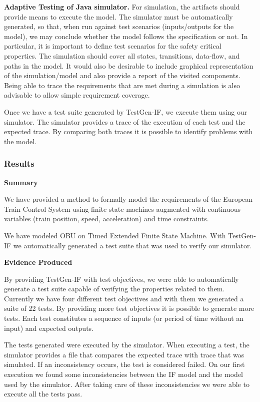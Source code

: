 \documentclass{template/openetcs_article}
\begin{document}
\textbf{Adaptive Testing of Java simulator.}
For simulation, the artifacts should provide means to execute the model.  The
simulator must be automatically generated, so that, when run against test
scenarios (inputs/outputs for the model), we may conclude whether the model
follows the specification or not. In particular, it is important to define test
scenarios for the safety critical properties. The simulation should cover all states,
transitions, data-flow, and paths in the model. It would also be desirable to
include graphical representation of the simulation/model and also provide a
report of the visited components. Being able to trace the
requirements that are met during a simulation is also advisable to allow simple
requirement coverage.

Once we have a test suite generated by TestGen-IF, we execute them using our simulator. The simulator provides a trace of the execution of each test and the expected trace. By comparing both traces it is possible to identify problems with the model.


\subsubsection{Results}

\textbf{Summary}

We have provided a method to formally model the
requirements of the European Train Control System using finite state machines
augmented with continuous variables (train position, speed, acceleration) and
time constraints. 

We have modeled OBU on Timed Extended Finite State Machine.
With TestGen-IF we automatically generated a test suite that was used to verify our simulator.
%

\textbf{Evidence Produced}

By providing TestGen-IF with test objectives, we were able to automatically generate a test suite capable of verifying the properties related to them. Currently we have four different test objectives and with them we generated a suite of 22 tests. By providing more test objectives it is possible to generate more tests.
Each test constitutes a sequence of inputs (or period of time without an input) and expected outputs.

The tests generated were executed by the simulator. When executing a test, the simulator provides a file that compares the expected trace with trace that was simulated. If an inconsistency occurs, the test is considered failed. On our first execution we found some inconsistencies between the IF model and the model used by the simulator. After taking care of these inconsistencies we were able to execute all the tests pass.
\end{document}
